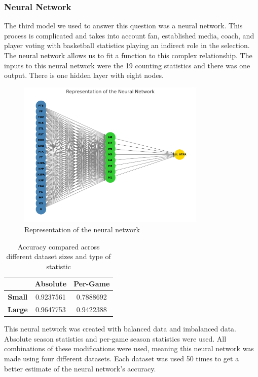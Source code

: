 \documentclass[12pt]{article}
\begin{document}
\subsubsection{Neural Network}

The third model we used to answer this question was a neural network. This process is complicated and takes into account fan, established media, coach, and player voting with basketball statistics playing an indirect role in the selection. The neural network allows us to fit a function to this complex relationship. The inputs to this neural network were the 19 counting statistics and there was one output. There is one hidden layer with eight nodes. 

\begin{figure}[h]
    \centering
    \includegraphics[width=0.8\textwidth]{AS_MM_NN_GRAPHIC.png}
    \caption{Representation of the neural network}
    \label{fig:minutes_difference_distribution}
\end{figure}

\begin{table}[h]
    \centering
    \begin{tabular}{c|cc}
        \toprule
        & \textbf{Absolute} & \textbf{Per-Game} \\
        \midrule
        \textbf{Small} & 0.9237561 & 0.7888692 \\
        \textbf{Large} & 0.9647753 & 0.9422388 \\
        \bottomrule
    \end{tabular}
    \caption{Accuracy compared across different dataset sizes and type of statistic}
    \label{tab:absolute_vs_pergame}
\end{table}

This neural network was created with balanced data and imbalanced data. Absolute season statistics and per-game season statistics were used. All combinations of these modifications were used, meaning this neural network was made using four different datasets. Each dataset was used 50 times to get a better estimate of the neural network’s accuracy.
\end{document}
